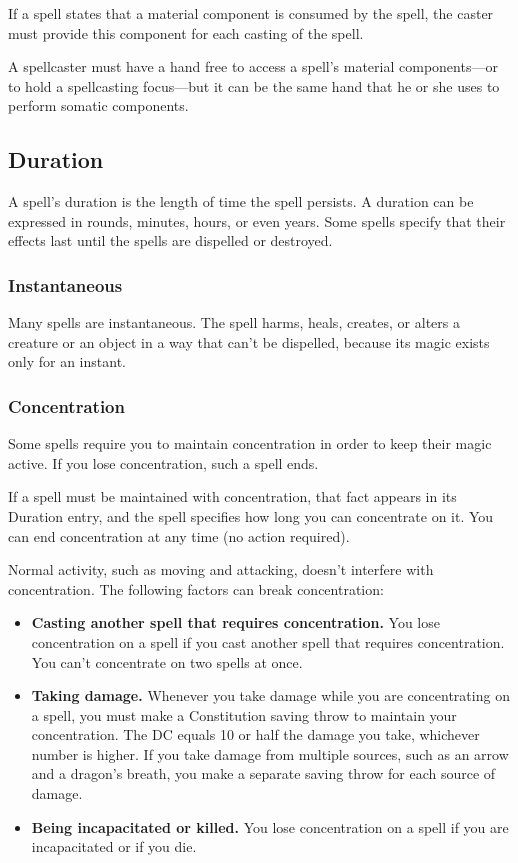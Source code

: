 If a spell states that a material component is consumed by the spell, the caster must provide this component for each casting of the spell.

A spellcaster must have a hand free to access a spell's material components—or to hold a spellcasting focus—but it can be the same hand that he or she uses to perform somatic components.

\subsection{Duration}

A spell's duration is the length of time the spell persists. A duration can be expressed in rounds, minutes, hours, or even years. Some spells specify that their effects last until the spells are dispelled or destroyed.

\subsubsection{Instantaneous}

Many spells are instantaneous. The spell harms, heals, creates, or alters a creature or an object in a way that can't be dispelled, because its magic exists only for an instant.

\subsubsection{Concentration}

Some spells require you to maintain concentration in order to keep their magic active. If you lose concentration, such a spell ends.

If a spell must be maintained with concentration, that fact appears in its Duration entry, and the spell specifies how long you can concentrate on it. You can end concentration at any time (no action required).

Normal activity, such as moving and attacking, doesn't interfere with concentration. The following factors can break concentration:

\begin{itemize}
    \item \textbf{Casting another spell that requires concentration.} You lose concentration on a spell if you cast another spell that requires concentration. You can't concentrate on two spells at once.
    \item \textbf{Taking damage.} Whenever you take damage while you are concentrating on a spell, you must make a Constitution saving throw to maintain your concentration. The DC equals 10 or half the damage you take, whichever number is higher. If you take damage from multiple sources, such as an arrow and a dragon's breath, you make a separate saving throw for each source of damage.
    \item \textbf{Being incapacitated or killed.} You lose concentration on a spell if you are incapacitated or if you die.
\end{itemize}

